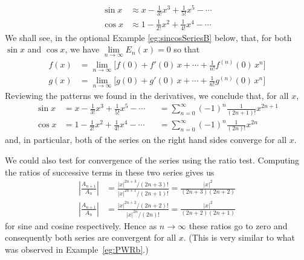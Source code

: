 \begin{eg}
\begin{align*}
\sin x &\approx x-\tfrac{1}{3!}x^3+\tfrac{1}{5!}x^5-\cdots\\
\cos x &\approx 1-\tfrac{1}{2!}x^2+\tfrac{1}{4!}x^4-\cdots
\end{align*}
We shall see, in the optional Example \ref{eg:sincosSeriesB}
below, that, for both $\sin x$ and $\cos x$,
we have $\lim\limits_{n\rightarrow\infty}E_n(x)=0$ so that
\begin{align*}
f(x)&=\lim_{n\rightarrow\infty}\Big[f(0)+f'(0)\,x+\cdots
                +\tfrac{1}{n!}f^{(n)}(0)\, x^n\Big] \\
g(x)&=\lim_{n\rightarrow\infty}\Big[g(0)+g'(0)\,x+\cdots
                +\tfrac{1}{n!}g^{(n)}(0)\, x^n\Big]
\end{align*}
Reviewing the patterns we found in the derivatives, we conclude that,
for all $x$,
\begin{equation*}%
\begin{alignedat}{2}
\sin x &= x-\tfrac{1}{3!}x^3+\tfrac{1}{5!}x^5-\cdots&
       &=\sum_{n=0}^\infty(-1)^n\tfrac{1}{(2n+1)!}x^{2n+1}\\
\cos x &= 1-\tfrac{1}{2!}x^2+\tfrac{1}{4!}x^4-\cdots&
       &=\sum_{n=0}^\infty(-1)^n\tfrac{1}{(2n)!}x^{2n}
\end{alignedat}
\end{equation*}
and, in particular, both of the series on the right hand sides converge
for all $x$.

We could also test for convergence of the series using
the ratio test. Computing the ratios of successive terms in these
two series gives us
\begin{align*}
  \left| \frac{A_{n+1}}{A_n} \right|
        &= \frac{|x|^{2n+3}/(2n+3)!}{|x|^{2n+1}/(2n+1)!}
         = \frac{|x|^2}{(2n+3)(2n+2)} \\
  \left| \frac{A_{n+1}}{A_n} \right|
        &= \frac{|x|^{2n+2}/(2n+2)!}{|x|^{2n}/(2n)!}
         = \frac{|x|^2}{(2n+2)(2n+1)}
\end{align*}
for sine and cosine respectively. Hence as $n \to \infty$ these ratios go to zero and consequently both series are
convergent for all $x$. (This is very similar to what was observed in Example~\ref{eg:PWRb}.)
\end{eg}



